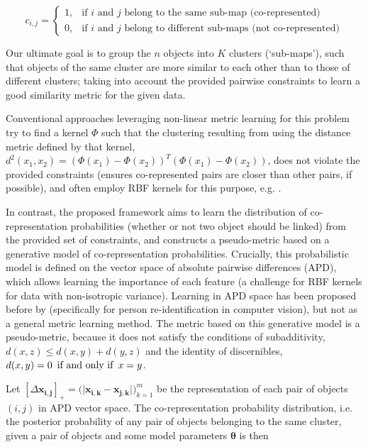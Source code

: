 \begin{equation}
c_{i,j}=
\begin{cases}
1, & \text{if $i$ and $j$ belong to the same sub-map (co-represented)} \\
0, & \text{if $i$ and $j$ belong to different sub-maps (not co-represented)}
\end{cases}
\end{equation}

Our ultimate goal is to group the $n$ objects into $K$ clusters (`sub-maps'), such that objects of the same cluster are more similar to each other than to those of different clusters; taking into account the provided pairwise constraints to learn a good similarity metric for the given data.

Conventional approaches leveraging non-linear metric learning for this problem try to find a kernel $\Phi$ such that the clustering resulting from using the distance metric defined by that kernel, $d^2(x_1, x_2)=(\Phi(x_1)-\Phi(x_2))^T(\Phi(x_1)-\Phi(x_2))$, does not violate the provided constraints (ensures co-represented pairs are closer than other pairs, if possible), and often employ RBF kernels for this purpose, e.g. \citep{baghshah2010kernel, chitta2011approximate}. 

In contrast, the proposed framework aims to learn the distribution of co-representation probabilities (whether or not two object should be linked) from the provided set of constraints, and constructs a pseudo-metric based on a generative model of co-representation probabilities. Crucially, this probabilistic model is defined on the vector space of absolute pairwise differences (APD), which allows learning the importance of each feature (a challenge for RBF kernels for data with non-isotropic variance). Learning in APD space has been proposed before by \cite{zheng2011person} (specifically for person re-identification in computer vision), but not as a general metric learning method. The metric based on this generative model is a pseudo-metric, because it does not satisfy the conditions of subadditivity, $d(x, z) \leq d(x, y)+d(y,z)$ and the identity of discernibles, $d(x, y) = 0 \enskip \text{if and only if} \enskip x = y$.

Let $[\Delta \boldsymbol{x_{i,j}}]_+ = \big( \lvert \boldsymbol{x_{i,k}} - \boldsymbol{x_{j,k}} \lvert \big)_{k=1}^m $ be the representation of each pair of objects $(i,j)$ in APD vector space. The co-representation probability distribution, i.e. the posterior probability of any pair of objects belonging to the same cluster, given a pair of objects and some model parameters $\boldsymbol{\theta}$ is then 

